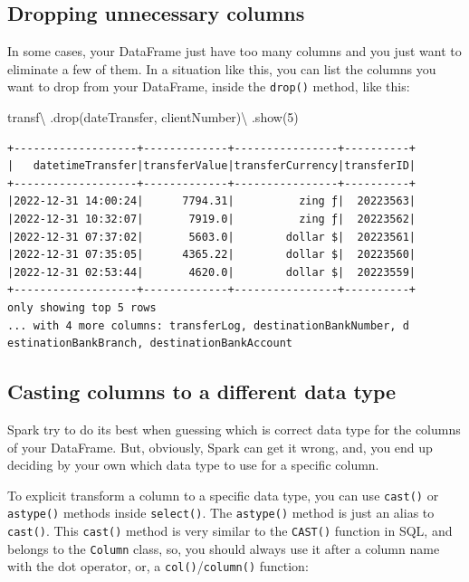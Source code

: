 \documentclass[
  11pt,
  letterpaper,
  DIV=11,
  numbers=noendperiod]{scrreprt}
\newenvironment{Shaded}{\begin{snugshade}}{\end{snugshade}}
\newcommand{\DecValTok}[1]{\textcolor[rgb]{0.68,0.00,0.00}{#1}}
\newcommand{\NormalTok}[1]{\textcolor[rgb]{0.00,0.23,0.31}{#1}}
\newcommand{\OperatorTok}[1]{\textcolor[rgb]{0.37,0.37,0.37}{#1}}
\newcommand{\StringTok}[1]{\textcolor[rgb]{0.13,0.47,0.30}{#1}}
\begin{document}
\subsection{Dropping unnecessary
columns}\label{dropping-unnecessary-columns}

In some cases, your DataFrame just have too many columns and you just
want to eliminate a few of them. In a situation like this, you can list
the columns you want to drop from your DataFrame, inside the
\texttt{drop()} method, like this:

\begin{Shaded}
\begin{Highlighting}[]
\NormalTok{transf}\OperatorTok{\textbackslash{}}
\NormalTok{  .drop(}\StringTok{\textquotesingle{}dateTransfer\textquotesingle{}}\NormalTok{, }\StringTok{\textquotesingle{}clientNumber\textquotesingle{}}\NormalTok{)}\OperatorTok{\textbackslash{}}
\NormalTok{  .show(}\DecValTok{5}\NormalTok{)}
\end{Highlighting}
\end{Shaded}

\begin{verbatim}
+-------------------+-------------+----------------+----------+
|   datetimeTransfer|transferValue|transferCurrency|transferID|
+-------------------+-------------+----------------+----------+
|2022-12-31 14:00:24|      7794.31|          zing ƒ|  20223563|
|2022-12-31 10:32:07|       7919.0|          zing ƒ|  20223562|
|2022-12-31 07:37:02|       5603.0|        dollar $|  20223561|
|2022-12-31 07:35:05|      4365.22|        dollar $|  20223560|
|2022-12-31 02:53:44|       4620.0|        dollar $|  20223559|
+-------------------+-------------+----------------+----------+
only showing top 5 rows
... with 4 more columns: transferLog, destinationBankNumber, d
estinationBankBranch, destinationBankAccount
\end{verbatim}

\subsection{Casting columns to a different data
type}\label{sec-cast-column-type}

Spark try to do its best when guessing which is correct data type for
the columns of your DataFrame. But, obviously, Spark can get it wrong,
and, you end up deciding by your own which data type to use for a
specific column.

To explicit transform a column to a specific data type, you can use
\texttt{cast()} or \texttt{astype()} methods inside \texttt{select()}.
The \texttt{astype()} method is just an alias to \texttt{cast()}. This
\texttt{cast()} method is very similar to the \texttt{CAST()} function
in SQL, and belongs to the \texttt{Column} class, so, you should always
use it after a column name with the dot operator, or, a
\texttt{col()}/\texttt{column()} function:
\end{document}
